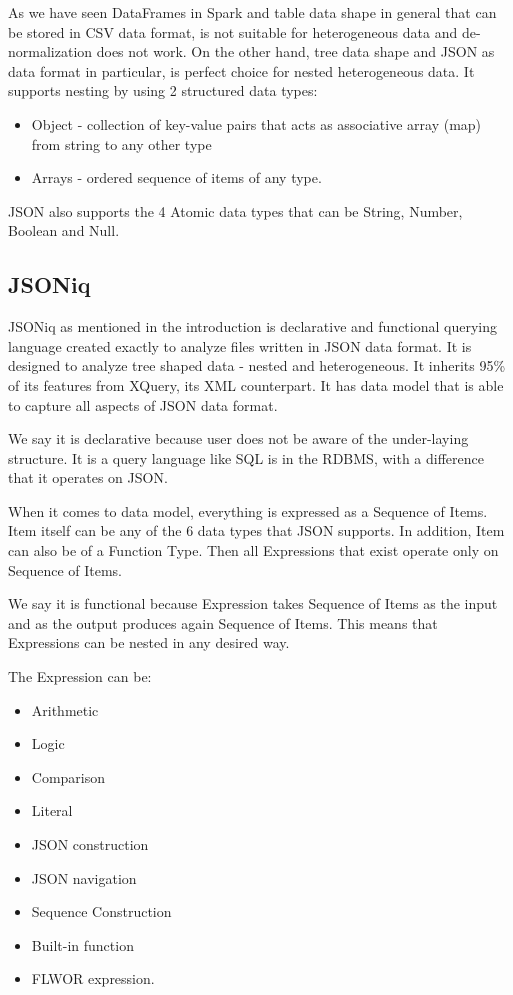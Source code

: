 As we have seen DataFrames in Spark and table data shape in general that can be stored in CSV data format, is not suitable for heterogeneous data and de-normalization does not work. On the other hand, tree data shape and JSON as data format in particular, is perfect choice for nested heterogeneous data. It supports nesting by using 2 structured data types:
\begin{itemize}
	\item Object - collection of key-value pairs that acts as associative array (map) from string to any other type 
	\item Arrays - ordered sequence of items of any type. 
\end{itemize} 

JSON also supports the 4 Atomic data types that can be String, Number, Boolean and Null.

\subsection{JSONiq}
\label{sec:JSONiq}
JSONiq \cite{JSONiqPaper} as mentioned in the introduction is declarative and functional querying language created exactly to analyze files written in JSON data format. It is designed to analyze tree shaped data - nested and heterogeneous. It inherits 95\% of its features from XQuery, its XML counterpart. It has data model that is able to capture all aspects of JSON data format. 

We say it is declarative because user does not be aware of the under-laying structure. It is a query language like SQL is in the RDBMS, with a difference that it operates on JSON.

When it comes to data model, everything is expressed as a Sequence of Items. Item itself can be any of the 6 data types that JSON supports. In addition, Item can also be of a Function Type. Then all Expressions that exist operate only on Sequence of Items. 

We say it is functional because Expression takes Sequence of Items as the input and as the output produces again Sequence of Items. This means that Expressions can be nested in any desired way.

The Expression can be: 
\begin{itemize}
	\item Arithmetic
	\item Logic
	\item Comparison
	\item Literal
	\item JSON construction
	\item JSON navigation
	\item Sequence Construction
	\item Built-in function
	\item FLWOR expression.
\end{itemize} 

